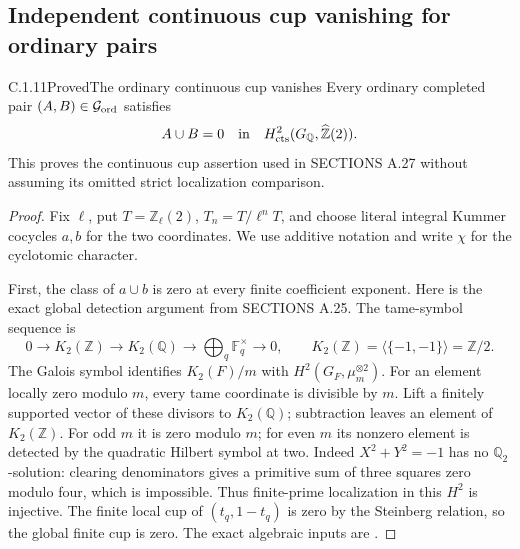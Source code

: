\subsection{Independent continuous cup vanishing for ordinary pairs}
\label{sec:ghost-ordinary-cup}

\begin{result}{C.1.11}{Proved}{The ordinary continuous cup vanishes}
\label{prop:ghost-ordinary-cup}
Every ordinary completed pair \((A,B)\in\mathcal G_{\rm ord}\)
satisfies
\[
           A\cup B=0\quad\hbox{in}\quad
 H^2_{\rm cts}(G_{\mathbb Q},\widehat{\mathbb Z}(2)).
\]
This proves the continuous cup assertion used in SECTIONS A.27
without assuming its omitted strict localization comparison.
\end{result}
\begin{proof}
Fix \(\ell\), put \(T=\mathbb Z_\ell(2)\),
\(T_n=T/\ell^nT\), and choose literal integral Kummer
cocycles \(a,b\) for the two coordinates. We use additive
notation and write \(\chi\) for the cyclotomic character.

First, the class of \(a\cup b\) is zero at every finite
coefficient exponent. Here is the exact global detection
argument from SECTIONS A.25. The tame-symbol sequence is
\[
 0\longrightarrow K_2(\mathbb Z)\longrightarrow K_2(\mathbb Q)
 \longrightarrow\bigoplus_q\mathbb F_q^\times\longrightarrow0,
 \qquad K_2(\mathbb Z)=\langle\{-1,-1\}\rangle=\mathbb Z/2.
\]
The Galois symbol identifies \(K_2(F)/m\) with
\(H^2(G_F,\mu_m^{\otimes2})\). For an element locally
zero modulo \(m\), every tame coordinate is divisible by
\(m\). Lift a finitely supported vector of these divisors
to \(K_2(\mathbb Q)\); subtraction leaves an element of
\(K_2(\mathbb Z)\). For odd \(m\) it is zero modulo
\(m\); for even \(m\) its nonzero element is detected by
the quadratic Hilbert symbol at two. Indeed
\(X^2+Y^2=-1\) has no \(\mathbb Q_2\)-solution: clearing
denominators gives a primitive sum of three squares zero
modulo four, which is impossible. Thus finite-prime
localization in this \(H^2\) is injective. The finite local
cup of \((t_q,1-t_q)\) is zero by the Steinberg relation,
so the global finite cup is zero. The exact algebraic inputs
are \cite[III.5.2.2, III.6.5--6.5.1, III.6.10.3--6.10.4]{GhostWeibelKbook}.


\end{proof}
